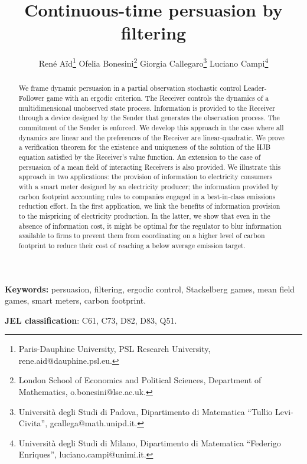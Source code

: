 \documentclass[a4paper,10pt]{article}
\theoremstyle{definition}
\theoremstyle{plain}
\numberwithin{equation}{section}
\begin{document}
\title{Continuous-time persuasion by filtering}
\author{René Aïd\thanks{Paris-Dauphine University, PSL Research University, rene.aid@dauphine.psl.eu.}\quad
Ofelia Bonesini\thanks{London School of Economics and Political Sciences, Department of Mathematics, o.bonesini@lse.ac.uk.}\quad
Giorgia Callegaro\thanks{Universit\`a degli Studi di  Padova, Dipartimento di Matematica ``Tullio Levi-Civita'', gcallega@math.unipd.it.}\quad
Luciano Campi\thanks{Universit\`a degli Studi di Milano, Dipartimento di Matematica ``Federigo Enriques'', luciano.campi@unimi.it.}
}
\maketitle

\begin{abstract}
We frame dynamic persuasion in a partial observation stochastic control Leader-Follower game with an ergodic criterion. The Receiver controls the dynamics of a multidimensional unobserved state process. Information is provided to the Receiver through a  device designed by the Sender that generates the observation process. The commitment of the Sender is enforced. We develop this approach in the case where all dynamics are linear and the preferences of the Receiver are linear-quadratic. We prove a verification theorem for the existence and uniqueness of the solution of the HJB equation satisfied by the Receiver's value function. An extension to the case of persuasion of a mean field of interacting Receivers is also provided. We illustrate this approach in two applications: the provision of information to electricity consumers with a smart meter designed by an electricity producer; the information provided by carbon footprint accounting rules to companies engaged in a best-in-class emissions reduction effort. In the first application, we link the benefits of information provision to the mispricing of electricity production. In the latter, we show that even in the absence of information cost, it might be optimal for the regulator to blur information available to firms to prevent them from coordinating on a higher level of carbon footprint to reduce their cost of reaching a below average emission target.
\end{abstract}

\textbf{Keywords:} persuasion, filtering, ergodic control, Stackelberg games, mean field games, smart meters, carbon footprint.

{\bf JEL classification}: C61, C73, D82, D83, Q51. 
\end{document}
